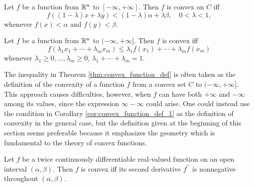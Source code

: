 \documentclass[11pt,a4paper]{article}
\begin{document}
\begin{corollary}\label{cor:convex_function_def_1}
    Let $f$ be a function from $\mathbb{R}^n$ to $[-\infty,+\infty]$. Then $f$ is convex on $C$ iff 
    \begin{equation*}
        f((1-\lambda)x+\lambda y) < (1-\lambda) \alpha + \lambda \beta, \quad 0<\lambda < 1,
    \end{equation*}
    whenever $f(x)<\alpha$ and $f(y)<\beta$.
\end{corollary}

\begin{corollary}\label{cor:convex_function_def_2}
    Let $f$ be a function from $\mathbb{R}^n$ to $(-\infty,+\infty]$. Then $f$ is convex iff 
    \begin{equation*}
        f(\lambda_1 x_1 + \cdots + \lambda_m x_m)\le \lambda_1 f(x_1) + \cdots + \lambda_m f(x_m)
    \end{equation*}
    whenever $\lambda_1\ge 0,\ldots,\lambda_m\ge 0$, $\lambda_1 + \cdots + \lambda_m = 1$.
\end{corollary}

\begin{remark}
    The inequality in Theorem \ref{thm:convex_function_def} is often taken as the definition of the convexity of a function $f$ from a convex set $C$ to $(-\infty,+\infty]$. This approach causes difficulties, however, when $f$ can have both $+\infty$ and $-\infty$ among its values, since the expression $\infty -\infty$ could arise. One could instead use the condition in Corollary \ref{cor:convex_function_def_1} as the definition of convexity in the general case, but the definition given at the beginning of this section seems preferable because it emphasizes the geometry which is fundamental to the theory of convex functions.
\end{remark}

\begin{theorem}\label{thm:convex_function_second_order}
    Let $f$ be a twice continuously differentiable real-valued function on an open interval $(\alpha,\beta)$. Then $f$ is convex iff its second derivative $f^{\prime\prime}$ is nonnegative throughout $(\alpha,\beta)$.
\end{theorem}
\end{document}
